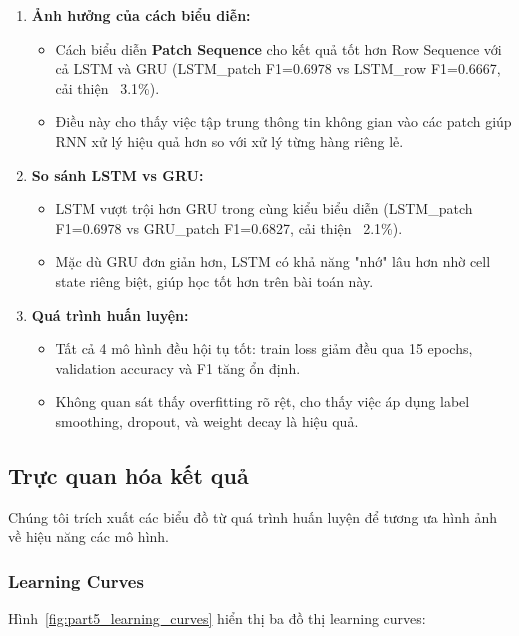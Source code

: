 \begin{enumerate}
    \item \textbf{Ảnh hưởng của cách biểu diễn:}
    \begin{itemize}
        \item Cách biểu diễn \textbf{Patch Sequence} cho kết quả tốt hơn Row Sequence với cả LSTM và GRU (LSTM\_patch F1=0.6978 vs LSTM\_row F1=0.6667, cải thiện ~3.1\%).
        \item Điều này cho thấy việc tập trung thông tin không gian vào các patch giúp RNN xử lý hiệu quả hơn so với xử lý từng hàng riêng lẻ.
    \end{itemize}
    
    \item \textbf{So sánh LSTM vs GRU:}
    \begin{itemize}
        \item LSTM vượt trội hơn GRU trong cùng kiểu biểu diễn (LSTM\_patch F1=0.6978 vs GRU\_patch F1=0.6827, cải thiện ~2.1\%).
        \item Mặc dù GRU đơn giản hơn, LSTM có khả năng "nhớ" lâu hơn nhờ cell state riêng biệt, giúp học tốt hơn trên bài toán này.
    \end{itemize}
    
    \item \textbf{Quá trình huấn luyện:}
    \begin{itemize}
        \item Tất cả 4 mô hình đều hội tụ tốt: train loss giảm đều qua 15 epochs, validation accuracy và F1 tăng ổn định.
        \item Không quan sát thấy overfitting rõ rệt, cho thấy việc áp dụng label smoothing, dropout, và weight decay là hiệu quả.
    \end{itemize}
\end{enumerate}

\subsection{Trực quan hóa kết quả}

Chúng tôi trích xuất các biểu đồ từ quá trình huấn luyện để tương ưa hình ảnh về hiệu năng các mô hình.

\subsubsection{Learning Curves}

Hình~\ref{fig:part5_learning_curves} hiển thị ba đồ thị learning curves:

